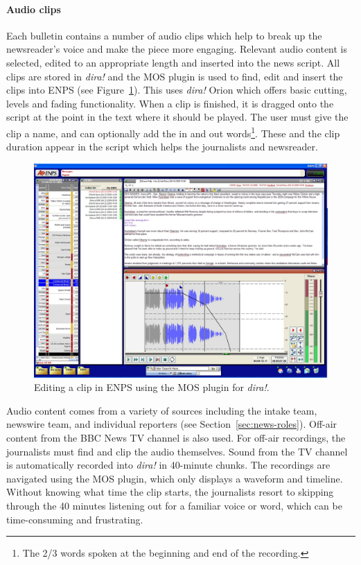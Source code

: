 \paragraph{Audio clips}\label{sec:news-clips}
Each bulletin contains a number of audio clips which help to break up the newsreader's voice and make the piece more
engaging.  Relevant audio content is selected, edited to an appropriate length and inserted into the news script.  All
clips are stored in \textit{dira!} and the MOS plugin is used to find, edit and insert the clips into ENPS (see
Figure~\ref{fig:news-enps-edit}).  This uses \textit{dira!} Orion which offers basic cutting, levels and fading
functionality. When a clip is finished, it is dragged onto the script at the point in the text where it should be
played. The user must give the clip a name, and can optionally add the in and out words\footnote{The 2/3 words spoken
  at the beginning and end of the recording.}. These and the clip duration appear in the script which helps the
journalists and newsreader.

\begin{figure}[ht]
  \centering
  \includegraphics[width=\columnwidth]{figs/news-enps-edit.jpg}
  \caption{Editing a clip in ENPS using the MOS plugin for \textit{dira!}.}
  \label{fig:news-enps-edit}
\end{figure}

Audio content comes from a variety of sources including the intake team, newswire team, and individual reporters (see
Section~\ref{sec:news-roles}).  Off-air content from the BBC News TV channel is also used.  For off-air recordings, the
journalists must find and clip the audio themselves. Sound from the TV channel is automatically recorded into
\textit{dira!} in 40-minute chunks. The recordings are navigated using the MOS plugin, which only displays a waveform
and timeline. Without knowing what time the clip starts, the journalists resort to skipping through the 40 minutes
listening out for a familiar voice or word, which can be time-consuming and frustrating.

